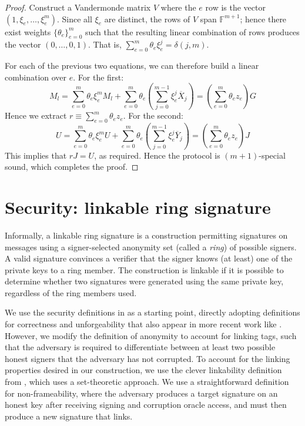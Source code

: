 \documentclass{article}
\newcommand{\F}{\mathbb{F}}
\newcommand{\sumj}{\sum_{j=0}^{m-1}}
\theoremstyle{definition}
\begin{document}
\begin{proof}
Construct a Vandermonde matrix $V$ where the $e$ row is the vector $(1,\xi_e,\ldots,\xi^m_e)$.
Since all $\xi_e$ are distinct, the rows of $V$ span $\F^{m+1}$; hence there exist weights $\{\theta_e\}_{e=0}^m$ such that the resulting linear combination of rows produces the vector $(0,\ldots,0,1)$.
That is, $\sum_{e=0}^m \theta_e\xi_e^j = \delta(j,m)$.

For each of the previous two equations, we can therefore build a linear combination over $e$.
For the first:
$$M_l = \sum_{e=0}^m \theta_e\xi_e^m M_l + \sum_{e=0}^m \theta_e \left( \sumj \xi_e^j \overline{X}_j \right) = \left( \sum_{e=0}^m \theta_e z_e \right) G$$
Hence we extract $r \equiv \sum_{e=0}^m \theta_e z_e$.
For the second:
$$U = \sum_{e=0}^m \theta_e\xi_e^m U + \sum_{e=0}^m \theta_e \left( \sumj \xi_e^j \overline{Y}_j \right) = \left( \sum_{e=0}^m \theta_e z_e \right) J$$
This implies that $rJ = U$, as required.
Hence the protocol is $(m+1)$-special sound, which completes the proof.
\end{proof}


\section{Security: linkable ring signature}
Informally, a linkable ring signature is a construction permitting signatures on messages using a signer-selected anonymity set (called a \textit{ring}) of possible signers.
A valid signature convinces a verifier that the signer knows (at least) one of the private keys to a ring member.
The construction is linkable if it is possible to determine whether two signatures were generated using the same private key, regardless of the ring members used.

We use the security definitions in \cite{groth} as a starting point, directly adopting definitions for correctness and unforgeability that also appear in more recent work like \cite{backes}.
However, we modify the definition of anonymity to account for linking tags, such that the adversary is required to differentiate between at least two possible honest signers that the adversary has not corrupted.
To account for the linking properties desired in our construction, we use the clever linkability definition from \cite{backes}, which uses a set-theoretic approach.
We use a straightforward definition for non-frameability, where the adversary produces a target signature on an honest key after receiving signing and corruption oracle access, and must then produce a new signature that links.
\end{document}
